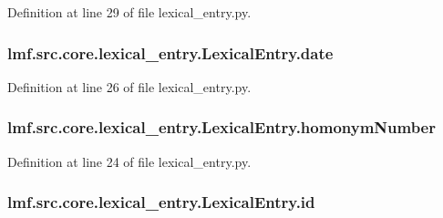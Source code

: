 Definition at line 29 of file lexical\+\_\+entry.\+py.

\hypertarget{classlmf_1_1src_1_1core_1_1lexical__entry_1_1_lexical_entry_ac6d96435547dea66e1433966098249b8}{
\subsubsection[{date}]{\setlength{\rightskip}{0pt plus 5cm}lmf.\+src.\+core.\+lexical\+\_\+entry.\+Lexical\+Entry.\+date}}\label{classlmf_1_1src_1_1core_1_1lexical__entry_1_1_lexical_entry_ac6d96435547dea66e1433966098249b8}


Definition at line 26 of file lexical\+\_\+entry.\+py.

\hypertarget{classlmf_1_1src_1_1core_1_1lexical__entry_1_1_lexical_entry_a402073c8f71f2f779725c6aeefa5df49}{
\subsubsection[{homonym\+Number}]{\setlength{\rightskip}{0pt plus 5cm}lmf.\+src.\+core.\+lexical\+\_\+entry.\+Lexical\+Entry.\+homonym\+Number}}\label{classlmf_1_1src_1_1core_1_1lexical__entry_1_1_lexical_entry_a402073c8f71f2f779725c6aeefa5df49}


Definition at line 24 of file lexical\+\_\+entry.\+py.

\hypertarget{classlmf_1_1src_1_1core_1_1lexical__entry_1_1_lexical_entry_a28fe2bf7e53e223a6919bb38b6d55256}{
\subsubsection[{id}]{\setlength{\rightskip}{0pt plus 5cm}lmf.\+src.\+core.\+lexical\+\_\+entry.\+Lexical\+Entry.\+id}}\label{classlmf_1_1src_1_1core_1_1lexical__entry_1_1_lexical_entry_a28fe2bf7e53e223a6919bb38b6d55256}


